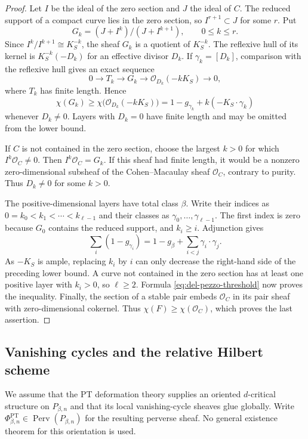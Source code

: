 \documentclass[11pt,reqno]{amsart}
\theoremstyle{definition}
\newcommand{\Ocal}{\mathcal O}
\newcommand{\PT}{\operatorname{PT}}
\begin{document}
\begin{proof}
Let \(I\) be the ideal of the zero section and \(J\) the ideal of \(C\).
The reduced support of a compact curve lies in the zero section, so
\(I^{r+1}\subset J\) for some \(r\).  Put
\[
 G_k=(J+I^k)/(J+I^{k+1}),\qquad 0\le k\le r.
\]
Since \(I^k/I^{k+1}\cong K_S^{-k}\), the sheaf \(G_k\) is a quotient of
\(K_S^{-k}\).  The reflexive hull of its kernel is
\(K_S^{-k}(-D_k)\) for an effective divisor \(D_k\).  If
\(\gamma_k=[D_k]\), comparison with the reflexive hull gives an exact
sequence
\[
 0\longrightarrow T_k\longrightarrow G_k
 \longrightarrow\Ocal_{D_k}(-kK_S)\longrightarrow0,
\]
where \(T_k\) has finite length.  Hence
\[
 \chi(G_k)\ge
 \chi\bigl(\Ocal_{D_k}(-kK_S)\bigr)
 =1-g_{\gamma_k}+k(-K_S\cdot\gamma_k)
\]
whenever \(D_k\ne0\).  Layers with \(D_k=0\) have finite length and may
be omitted from the lower bound.

If $C$ is not contained in the zero section, choose the largest $k>0$ for
which $I^k\Ocal_C\ne0$.  Then $I^k\Ocal_C=G_k$.  If this sheaf had finite
length, it would be a nonzero zero-dimensional subsheaf of the
Cohen--Macaulay sheaf $\Ocal_C$, contrary to purity.  Thus $D_k\ne0$ for
some $k>0$.

The positive-dimensional layers have total class \(\beta\).  Write their
indices as \(0=k_0<k_1<\cdots<k_{\ell-1}\) and their classes as
\(\gamma_0,\ldots,\gamma_{\ell-1}\).  The first index is zero because
\(G_0\) contains the reduced support, and \(k_i\ge i\).  Adjunction gives
\[
 \sum_i(1-g_{\gamma_i})
 =1-g_\beta+\sum_{i<j}\gamma_i\cdot\gamma_j.
\]
As \(-K_S\) is ample, replacing \(k_i\) by \(i\) can only decrease the
right-hand side of the preceding lower bound.  A curve not contained in
the zero section has at least one positive layer with \(k_i>0\), so
\(\ell\ge2\).  Formula \eqref{eq:del-pezzo-threshold} now proves the
inequality.  Finally, the section of a stable pair embeds \(\Ocal_C\) in
its pair sheaf with zero-dimensional cokernel.  Thus
\(\chi(F)\ge\chi(\Ocal_C)\), which proves the last assertion.
\end{proof}

\subsection{Vanishing cycles and the relative Hilbert scheme}

We assume that the PT deformation theory supplies an oriented $d$-critical
structure on $P_{\beta,n}$ and that its local vanishing-cycle sheaves glue
globally.  Write
$\Phi_{\beta,n}^{\PT}\in\operatorname{Perv}(P_{\beta,n})$ for the resulting
perverse sheaf.  No general existence theorem for this orientation is used.
\end{document}
